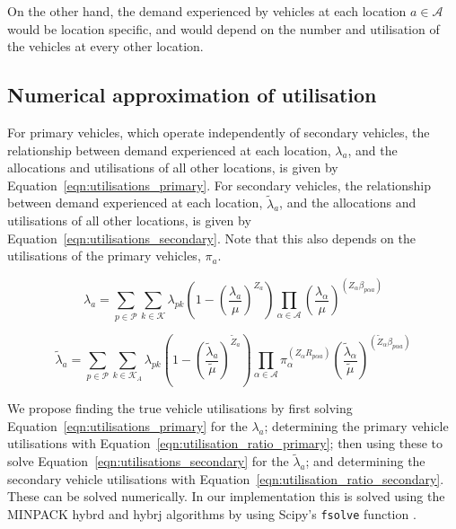 \documentclass[preprint,12pt]{elsarticle}
\begin{document}
On the other hand, the demand experienced by vehicles at each location
$a \in \mathcal{A}$ would be location specific, and would depend on the number
and utilisation of the vehicles at every other location.


\subsection{Numerical approximation of utilisation}
For primary vehicles, which operate independently of secondary vehicles, the
relationship between demand experienced at each location, $\lambda_a$, and the
allocations and utilisations of all other locations, is given by
Equation~\ref{eqn:utilisations_primary}. For secondary vehicles, the
relationship between demand experienced at each location, $\tilde{\lambda}_a$,
and the allocations and utilisations of all other locations, is given by
Equation~\ref{eqn:utilisations_secondary}. Note that this also depends on the
utilisations of the primary vehicles, $\pi_a$.

\begin{equation}\label{eqn:utilisations_primary}
\lambda_a = \sum_{p \in \mathcal{P}} \sum_{k \in \mathcal{K}} \lambda_{pk}
\left( 1 - \left(\frac{\lambda_a}{\mu}\right)^{Z_a} \right)
\prod_{\alpha \in \mathcal{A}} \left(\frac{\lambda_{\alpha}}{\mu}\right)^{
\left(Z_{\alpha} \beta_{p \alpha a}\right)}
\end{equation}

\begin{equation}\label{eqn:utilisations_secondary}
\tilde{\lambda}_a = \sum_{p \in \mathcal{P}}
\sum_{k \in \mathcal{K}_A} \lambda_{pk}
\left( 1 - \left(\frac{\tilde{\lambda}_a}{\tilde{\mu}}\right)^{\tilde{Z}_a} \right)
\prod_{\alpha \in \mathcal{A}} \pi_{\alpha}^{\left(Z_{\alpha} R_{p \alpha a}\right)}
\left(\frac{\tilde{\lambda}_{\alpha}}{\tilde{\mu}}\right)^{
\left(\tilde{Z}_{\alpha} \beta_{p \alpha a}\right)}
\end{equation}

We propose finding the true vehicle utilisations by first solving
Equation~\ref{eqn:utilisations_primary} for the $\lambda_a$; determining the
primary vehicle utilisations with Equation~\ref{eqn:utilisation_ratio_primary};
then using these to solve Equation~\ref{eqn:utilisations_secondary} for the
$\tilde{\lambda}_a$; and determining the secondary vehicle utilisations with
Equation~\ref{eqn:utilisation_ratio_secondary}. These can be solved
numerically. In our implementation this is solved using the MINPACK hybrd and
hybrj algorithms by using Scipy's \texttt{fsolve} function
\cite{2020SciPy-NMeth}.
\end{document}

